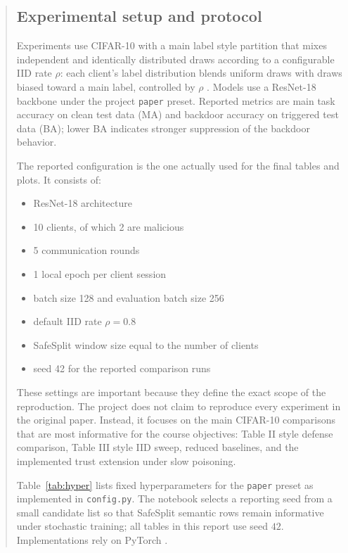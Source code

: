 \documentclass{article}
\begin{document}
\begin{abstract}
\subsection{Experimental setup and protocol}
\label{sec:setup}

Experiments use CIFAR-10 \cite{krizhevsky2009cifar} with a main label style partition that mixes independent and identically distributed draws according to a configurable IID rate $\rho$: each client's label distribution blends uniform draws with draws biased toward a main label, controlled by $\rho$ \cite{safesplit2025}. Models use a ResNet-18 backbone under the project \texttt{paper} preset. Reported metrics are main task accuracy on clean test data (MA) and backdoor accuracy on triggered test data (BA); lower BA indicates stronger suppression of the backdoor behavior.

The reported configuration is the one actually used for the final tables and plots. It consists of:
\begin{itemize}
    \item ResNet-18 architecture
    \item 10 clients, of which 2 are malicious
    \item 5 communication rounds
    \item 1 local epoch per client session
    \item batch size 128 and evaluation batch size 256
    \item default IID rate $\rho = 0.8$
    \item SafeSplit window size equal to the number of clients
    \item seed 42 for the reported comparison runs
\end{itemize}

These settings are important because they define the exact scope of the reproduction. The project does not claim to reproduce every experiment in the original paper. Instead, it focuses on the main CIFAR-10 comparisons that are most informative for the course objectives: Table II style defense comparison, Table III style IID sweep, reduced baselines, and the implemented trust extension under slow poisoning.

Table~\ref{tab:hyper} lists fixed hyperparameters for the \texttt{paper} preset as implemented in \texttt{config.py}. The notebook selects a reporting seed from a small candidate list so that SafeSplit semantic rows remain informative under stochastic training; all tables in this report use seed $42$. Implementations rely on PyTorch \cite{paszke2019pytorch}.


\end{abstract}
\end{document}
